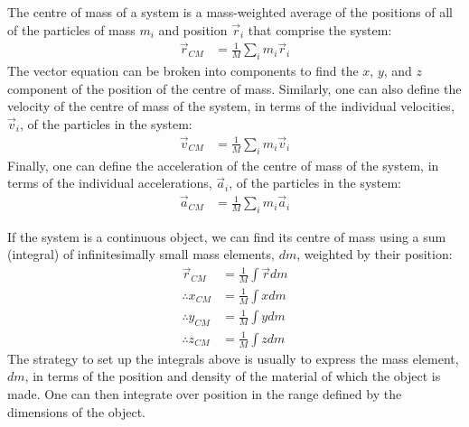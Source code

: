 \begin{chapterSummary}
{The centre of mass of a system is a mass-weighted average of the positions of all of the particles of mass $m_i$ and position $\vec r_i$ that comprise the system:
\begin{align*}
\vec r_{CM} &=\frac{1}{M}\sum_i m_i\vec r_i
\end{align*}
The vector equation can be broken into components to find the $x$, $y$, and $z$ component of the position of the centre of mass. Similarly, one can also define the velocity of the centre of mass of the system, in terms of the individual velocities, $\vec v_i$, of the particles in the system:
\begin{align*}
\vec v_{CM} &= \frac{1}{M}\sum_i m_i\vec v_i
\end{align*}
Finally, one can define the acceleration of the centre of mass of the system, in terms of the individual accelerations, $\vec a_i$, of the particles in the system:
\begin{align*}
\vec a_{CM} &=  \frac{1}{M}\sum_i m_i\vec a_i
\end{align*}

If the system is a continuous object, we can find its centre of mass using a sum (integral) of infinitesimally small mass elements, $dm$, weighted by their position:
\begin{align*}
\vec r_{CM} &=\frac{1}{M}\int \vec r dm\\
\therefore x_{CM} &= \frac{1}{M}\int x dm\\
\therefore y_{CM} &=  \frac{1}{M}\int y dm\\
\therefore z_{CM} &=  \frac{1}{M}\int z dm
\end{align*}
The strategy to set up the integrals above is usually to express the mass element, $dm$, in terms of the position and density of the material of which the object is made. One can then integrate over position in the range defined by the dimensions of the object.
}
\end{chapterSummary}


